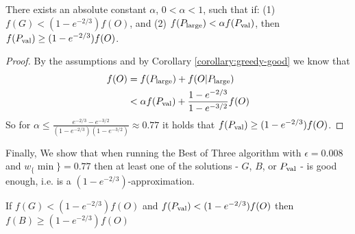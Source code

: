\begin{lemma}
	\label{lemma:sub:alpha}
	There exists an absolute constant $\alpha$, $0 < \alpha < 1$, such that if: (1) $f(G) < (1 - e^{-2/3})f(O)$, and (2) $f(P_{\text{large}}) < \alpha f(P_{\text{val}})$, then $f(P_{\text{val}}) \geq (1 - e^{-2/3})f(O)$.
\end{lemma}

\begin{proof}
	By the assumptions and by Corollary \ref{corollary:greedy-good} we know that 
	\begin{align}
		f(O)	& = f(P_{\text{large}}) + f(O|P_{\text{large}}) 
		\\ 		& < \alpha f(P_{\text{val}}) + \frac{1-e^{-2/3}}{1-e^{-3/2}}f(O)
	\end{align}
	So for $\alpha \leq \frac{e^{-2/3} - e^{-3/2}}{(1-e^{-2/3})(1-e^{-3/2})} \approx 0.77$ it holds that $f(P_{\text{val}}) \geq (1 - e^{-2/3})f(O)$.
\end{proof}

Finally, We show that when running the Best of Three algorithm with $\epsilon = 0.008$ and $w_\{\min\} = 0.77$ then at least one of the solutions - $G$, $B$, or $P_{\text{val}}$ - is good enough, i.e. is a $(1 - e^{-2/3})$-approximation.

\begin{theorem}
	\label{theorem:mmgreedy-or-bucket}
	If $f(G) < (1 - e^{-2/3})f(O)$ and $f(P_{\text{val}}) < (1 - e^{-2/3})f(O)$ then $f(B) \geq (1 - e^{-2/3})f(O)$
\end{theorem}


